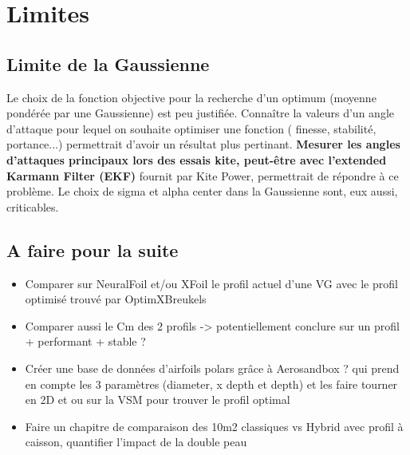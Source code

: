 
\chapter{Limites} 	
\label{Chapter5} 		


\section{Limite de la Gaussienne}
\label{sec:Ch4.1}

Le choix de la fonction objective pour la recherche d'un optimum (moyenne pondérée par une Gaussienne) est peu justifiée. Connaître la valeurs d'un angle d'attaque pour lequel on souhaite optimiser une fonction ( finesse, stabilité, portance...) permettrait d'avoir un résultat plus pertinant. \textbf{Mesurer les angles d'attaques principaux lors des essais kite, peut-être avec l'extended Karmann Filter (EKF)} fournit par Kite Power, permettrait de répondre à ce problème. Le choix de sigma et alpha center dans la Gaussienne sont, eux aussi, criticables.\\




\section{A faire pour la suite}
\label{sec:Ch4.2}

\begin{itemize}
    \item Comparer sur NeuralFoil et/ou XFoil le profil actuel d’une VG avec le profil optimisé trouvé par OptimXBreukels
    \item Comparer aussi le Cm des 2 profils -> potentiellement conclure sur un profil + performant + stable ?
    \item Créer une base de données d'airfoils polars grâce à Aerosandbox ? qui prend en compte les 3 paramètres (diameter, x depth et depth) et les faire tourner en 2D et ou sur la VSM pour trouver le profil optimal
    \item Faire un chapitre de comparaison des 10m2 classiques vs Hybrid avec profil à caisson, quantifier l'impact de la double peau
\end{itemize}